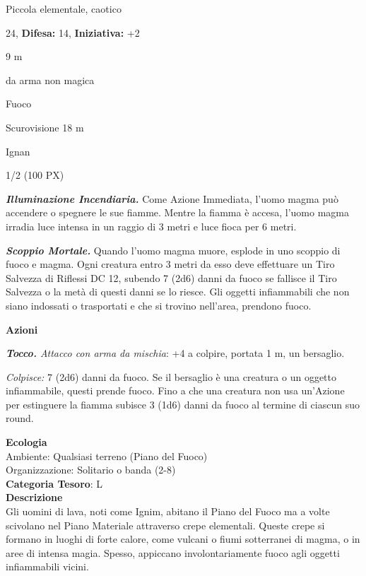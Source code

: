 \begin{multicols}{2}
{
\noindent
\begin{description}[noitemsep, topsep=0pt, parsep=0pt, partopsep=0pt, leftmargin=0cm, labelwidth=2.2cm]
	\item[\textbf{Taglia/Tipo:}] Piccola elementale, caotico
	\item[\textbf{Caratt.:}] 
	\item[\textbf{Punti Ferita:}] 24,  \textbf{Difesa:} 14,  \textbf{Iniziativa:} +2
	\item[\textbf{Movimento:}] 9 m
	\item[\textbf{Tiri Salvez.:}] 
	\item[\textbf{Res. Danni:}] da arma non magica\\
	\item[\textbf{Imm. Danni:}] Fuoco
	\item[\textbf{Sensi:}] Scurovisione 18 m
	\item[\textbf{Linguaggi:}] Ignan
	\item[\textbf{Sfida:}] 1/2 (100 PX)\smallskip
\end{description}

\emph{\textbf{Illuminazione Incendiaria.}} Come Azione Immediata, l'uomo magma può accendere o spegnere le sue fiamme. Mentre la fiamma è accesa, l'uomo magma irradia luce intensa in un raggio di 3 metri e luce fioca per 6 metri.

\emph{\textbf{Scoppio Mortale.}} Quando l'uomo magma muore, esplode in uno scoppio di fuoco e magma. Ogni creatura entro 3 metri da esso deve effettuare un Tiro Salvezza di Riflessi DC 12, subendo 7 (2d6) danni da fuoco se fallisce il Tiro Salvezza o la metà di questi danni se lo riesce. Gli oggetti infiammabili che non siano indossati o trasportati e che si trovino nell'area, prendono fuoco.

\textbf{Azioni}

\emph{\textbf{Tocco.} Attacco con arma da mischia}: +4 a colpire, portata 1 m, un bersaglio.

\emph{Colpisce:} 7 (2d6) danni da fuoco. Se il bersaglio è una creatura o un oggetto infiammabile, questi prende fuoco. Fino a che una creatura non usa un'Azione per estinguere la fiamma subisce 3 (1d6) danni da fuoco al termine di ciascun suo round.

\textbf{Ecologia}\\
Ambiente: Qualsiasi terreno (Piano del Fuoco)\\
Organizzazione: Solitario o banda (2-8)\\
\textbf{Categoria Tesoro}: L\\
\textbf{Descrizione}\\
Gli uomini di lava, noti come Ignim, abitano il Piano del Fuoco ma a volte scivolano nel Piano Materiale attraverso crepe elementali. Queste crepe si formano in luoghi di forte calore, come vulcani o fiumi sotterranei di magma, o in aree di intensa magia. Spesso, appiccano involontariamente fuoco agli oggetti infiammabili vicini.

}
\end{multicols}
